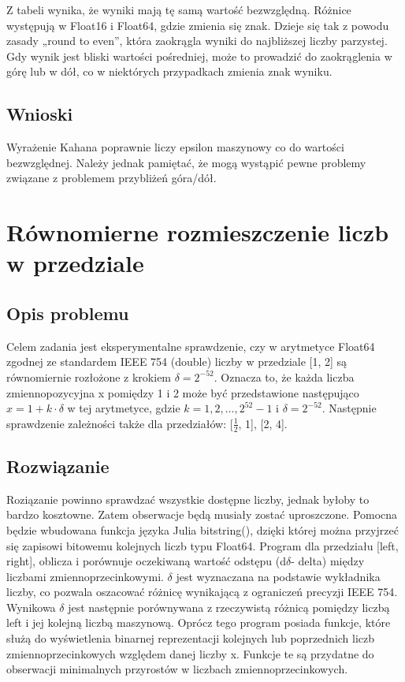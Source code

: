 \documentclass{article}
\begin{document}
Z tabeli wynika, że wyniki mają tę samą wartość bezwzględną. Różnice występują w Float16 i Float64, gdzie zmienia się znak. Dzieje się tak z powodu zasady „round to even”, która zaokrągla wyniki do najbliższej liczby parzystej. Gdy wynik jest bliski wartości pośredniej, może to prowadzić do zaokrąglenia w górę lub w dół, co w niektórych przypadkach zmienia znak wyniku.
\subsection{Wnioski}
Wyrażenie Kahana poprawnie liczy epsilon maszynowy co do wartości bezwzględnej. Należy jednak pamiętać, że mogą wystąpić pewne problemy związane z problemem przybliżeń góra/dół.
\section{Równomierne rozmieszczenie liczb w przedziale}
\subsection{Opis problemu}
Celem zadania jest eksperymentalne sprawdzenie, czy w arytmetyce Float64 zgodnej ze standardem IEEE 754 (double) liczby w przedziale [1, 2] są równomiernie rozłożone z krokiem $\delta = 2^{-52}$. Oznacza to, że każda liczba zmiennopozycyjna x pomiędzy 1 i 2 może
być przedstawione następująco $x = 1 + k \cdot \delta$ w tej arytmetyce, gdzie $k = 1, 2, ..., 2^{52} - 1$ i $\delta = 2^{-52}$. Następnie sprawdzenie zależności także dla przedziałów: [$\frac{1}{2}$, 1], [2, 4].
\subsection{Rozwiązanie}
Roziązanie powinno sprawdzać wszystkie dostępne liczby, jednak byłoby to bardzo kosztowne. Zatem obserwacje będą musiały zostać uproszczone. Pomocna będzie wbudowana funkcja języka Julia bitstring(), dzięki której można przyjrzeć się zapisowi bitowemu kolejnych liczb typu Float64. Program dla przedziału [left, right], oblicza i porównuje oczekiwaną wartość odstępu (d$\delta$- delta) między liczbami zmiennoprzecinkowymi. $\delta$ jest wyznaczana na podstawie wykładnika liczby, co pozwala oszacować różnicę wynikającą z ograniczeń precyzji IEEE 754. Wynikowa $\delta$ jest następnie porównywana z rzeczywistą różnicą pomiędzy liczbą left i jej kolejną liczbą maszynową. Oprócz tego program posiada funkcje, które służą do wyświetlenia binarnej reprezentacji kolejnych lub poprzednich liczb zmiennoprzecinkowych względem danej liczby x. Funkcje te są przydatne do obserwacji minimalnych przyrostów w liczbach zmiennoprzecinkowych.
\end{document}
